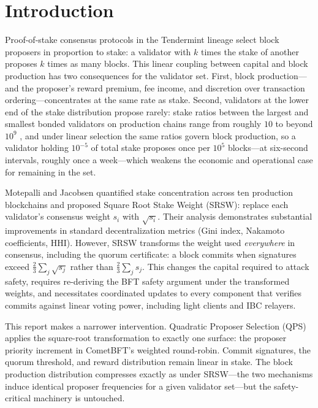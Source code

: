 \documentclass[11pt,a4paper]{article}
\begin{document}
\section{Introduction}

Proof-of-stake consensus protocols in the Tendermint lineage \cite{kwon,buchman} select block proposers in proportion to stake: a validator with $k$ times the stake of another proposes $k$ times as many blocks. This linear coupling between capital and block production has two consequences for the validator set. First, block production---and the proposer's reward premium, fee income, and discretion over transaction ordering---concentrates at the same rate as stake. Second, validators at the lower end of the stake distribution propose rarely: stake ratios between the largest and smallest bonded validators on production chains range from roughly $10$ to beyond $10^{9}$ \cite{srsw}, and under linear selection the same ratios govern block production, so a validator holding $10^{-5}$ of total stake proposes once per $10^{5}$ blocks---at six-second intervals, roughly once a week---which weakens the economic and operational case for remaining in the set.

Motepalli and Jacobsen \cite{srsw} quantified stake concentration across ten production blockchains and proposed Square Root Stake Weight (SRSW): replace each validator's consensus weight $s_i$ with $\sqrt{s_i}$. Their analysis demonstrates substantial improvements in standard decentralization metrics (Gini index, Nakamoto coefficients, HHI). However, SRSW transforms the weight used \emph{everywhere} in consensus, including the quorum certificate: a block commits when signatures exceed $\frac{2}{3}\sum_j \sqrt{s_j}$ rather than $\frac{2}{3}\sum_j s_j$. This changes the capital required to attack safety, requires re-deriving the BFT safety argument under the transformed weights, and necessitates coordinated updates to every component that verifies commits against linear voting power, including light clients and IBC relayers.

This report makes a narrower intervention. Quadratic Proposer Selection (QPS) applies the square-root transformation to exactly one surface: the proposer priority increment in CometBFT's weighted round-robin. Commit signatures, the quorum threshold, and reward distribution remain linear in stake. The block production distribution compresses exactly as under SRSW---the two mechanisms induce identical proposer frequencies for a given validator set---but the safety-critical machinery is untouched.
\end{document}
